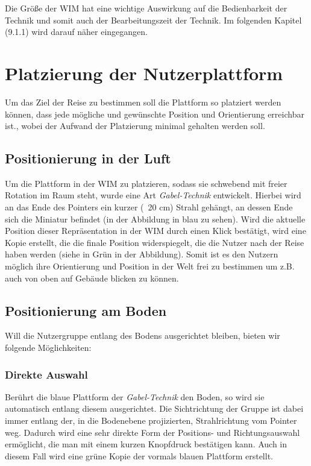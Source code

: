 Die Größe der WIM hat eine wichtige Auswirkung auf die Bedienbarkeit der Technik und somit auch der Bearbeitungszeit der Technik. Im folgenden Kapitel (9.1.1) wird darauf näher eingegangen.

\section{Platzierung der Nutzerplattform}
Um das Ziel der Reise zu bestimmen soll die Plattform so platziert werden können, dass jede mögliche und gewünschte Position und Orientierung erreichbar ist., wobei der Aufwand der Platzierung minimal gehalten werden soll.

\subsection{Positionierung in der Luft}
Um die Plattform in der WIM zu platzieren, sodass sie schwebend mit freier Rotation im Raum steht, wurde eine Art \textit{Gabel-Technik} entwickelt. Hierbei wird an das Ende des Pointers ein kurzer (~20 cm) Strahl gehängt, an dessen Ende sich die Miniatur befindet (in der Abbildung in blau zu sehen). Wird die aktuelle Position dieser Repräsentation in der WIM durch einen Klick bestätigt, wird eine Kopie erstellt, die die finale Position widerspiegelt, die die Nutzer nach der Reise haben werden (siehe in Grün in der Abbildung).
Somit ist es den Nutzern möglich ihre Orientierung und Position in der Welt frei zu bestimmen um z.B. auch von oben auf Gebäude blicken zu können.


\subsection{Positionierung am Boden}
Will die Nutzergruppe entlang des Bodens ausgerichtet bleiben, bieten wir folgende Möglichkeiten:

\subsubsection{Direkte Auswahl}
Berührt die blaue Plattform der \textit{Gabel-Technik} den Boden, so wird sie automatisch entlang diesem ausgerichtet. Die Sichtrichtung der Gruppe ist dabei immer entlang der, in die Bodenebene projizierten, Strahlrichtung vom Pointer weg. Dadurch wird eine sehr direkte Form der Positions- und Richtungsauswahl ermöglicht, die man mit einem kurzen Knopfdruck bestätigen kann. Auch in diesem Fall wird eine grüne Kopie der vormals blauen Plattform erstellt.

